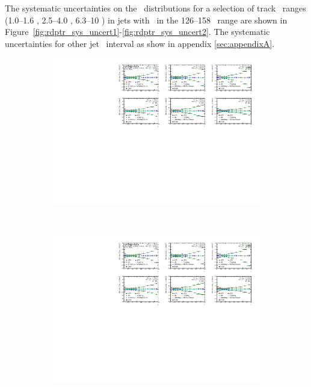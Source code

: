 
The systematic uncertainties on the \Rdptr\ distributions for a selection of track \pt\ ranges (1.0--1.6 \GeV, 2.5--4.0 \GeV, 6.3--10 \GeV) in jets with \pt\ in the 126--158 \GeV\ range are shown in Figure~\ref{fig:rdptr_sys_uncert1}-\ref{fig:rdptr_sys_uncert2}.
The systematic uncertainties for other jet \pT\ interval as show in appendix \ref{sec:appendixA}.


\begin{figure}
\centering
\begin{subfigure}[b]{\textwidth}
    \centering
    \includegraphics[page=1, width=\textwidth]{figures/main/systematics/Summary_ChPS_dR_sys_PbPb_error}
    \caption{}
    \label{fig:rdptr_sys_uncert1a}
\end{subfigure} \\
\begin{subfigure}[b]{\textwidth}
    \centering
    \includegraphics[page=3, width=\textwidth]{figures/main/systematics/Summary_ChPS_dR_sys_PbPb_error}

\end{subfigure}
\end{figure}
